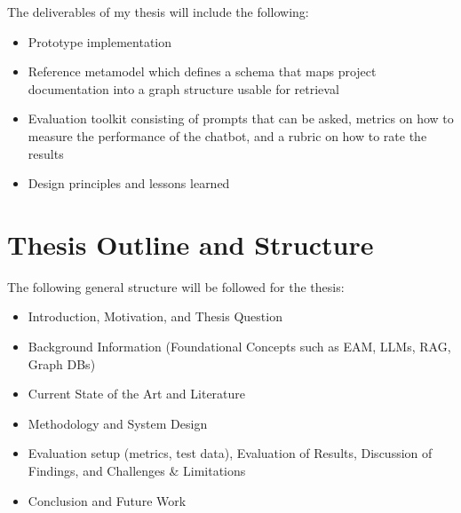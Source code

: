 \documentclass[english]{lni}
\begin{document}
The deliverables of my thesis will include the following:
\begin{itemize}
	\item Prototype implementation
	\item Reference metamodel which defines a schema that maps project documentation into a graph structure usable for retrieval
	\item Evaluation toolkit consisting of prompts that can be asked, metrics on how to measure the performance of the chatbot, and a rubric on how to rate the results
	\item Design principles and lessons learned
\end{itemize}

\section{Thesis Outline and Structure}
The following general structure will be followed for the thesis:

\begin{itemize}
    \item Introduction, Motivation, and Thesis Question
    \item Background Information (Foundational Concepts such as EAM, LLMs, RAG, Graph DBs)
    \item Current State of the Art and Literature
    \item Methodology and System Design
    \item Evaluation setup (metrics, test data), Evaluation of Results, Discussion of Findings, and Challenges \& Limitations
    \item Conclusion and Future Work
\end{itemize}




\printbibliography
\end{document}
